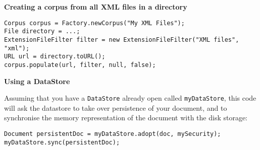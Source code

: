 \begin{minipage}{\textwidth}

{\bf Creating a corpus from all XML files in a directory}


\begin{lstlisting}
Corpus corpus = Factory.newCorpus("My XML Files");
File directory = ...;
ExtensionFileFilter filter = new ExtensionFileFilter("XML files", "xml");
URL url = directory.toURL();
corpus.populate(url, filter, null, false);
\end{lstlisting}

\end{minipage}

{\bf Using a DataStore}

Assuming that you have a {\tt DataStore} already open called {\tt myDataStore},
this code will ask the datastore to take over persistence of your document, and
to synchronise the memory representation of the document with the disk storage:
\begin{small}\begin{verbatim}
Document persistentDoc = myDataStore.adopt(doc, mySecurity);
myDataStore.sync(persistentDoc);
\end{verbatim}\end{small}


